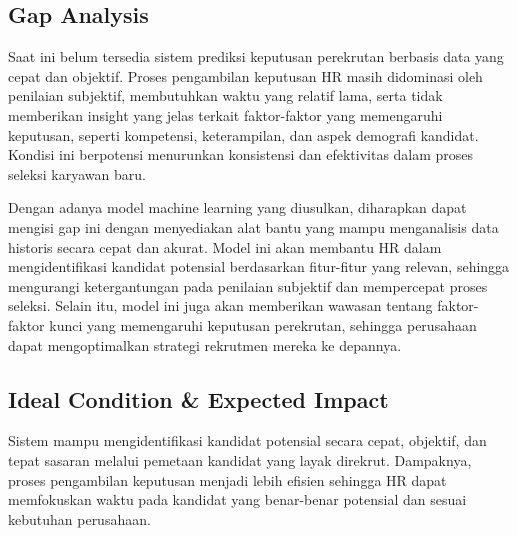 \subsection{Gap Analysis}
Saat ini belum tersedia sistem prediksi keputusan perekrutan berbasis data yang cepat dan objektif. Proses pengambilan keputusan HR masih didominasi oleh penilaian subjektif, membutuhkan waktu yang relatif lama, serta tidak memberikan insight yang jelas terkait faktor-faktor yang memengaruhi keputusan, seperti kompetensi, keterampilan, dan aspek demografi kandidat. Kondisi ini berpotensi menurunkan konsistensi dan efektivitas dalam proses seleksi karyawan baru.

Dengan adanya model machine learning yang diusulkan, diharapkan dapat mengisi gap ini dengan menyediakan alat bantu yang mampu menganalisis data historis secara cepat dan akurat. Model ini akan membantu HR dalam mengidentifikasi kandidat potensial berdasarkan fitur-fitur yang relevan, sehingga mengurangi ketergantungan pada penilaian subjektif dan mempercepat proses seleksi. Selain itu, model ini juga akan memberikan wawasan tentang faktor-faktor kunci yang memengaruhi keputusan perekrutan, sehingga perusahaan dapat mengoptimalkan strategi rekrutmen mereka ke depannya.

\subsection{Ideal Condition \& Expected Impact}
Sistem mampu mengidentifikasi kandidat potensial secara cepat, objektif, dan tepat sasaran melalui pemetaan kandidat yang layak direkrut. Dampaknya, proses pengambilan keputusan menjadi lebih efisien sehingga HR dapat memfokuskan waktu pada kandidat yang benar-benar potensial dan sesuai kebutuhan perusahaan.




